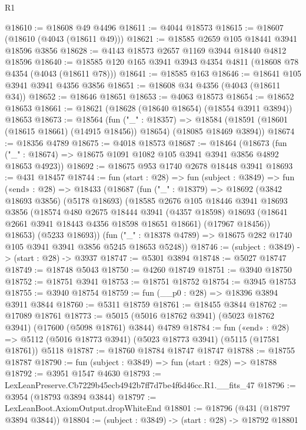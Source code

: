 \begin{lexlean}{R1}
\begin{coremodule}
@18610 := @18608 @49 @4496
@18611 := @4044 @18573
@18615 := @18607 (@18610 (@4043 (@18611 @49)))
@18621 := @18585 @2659 @105 @18441 @3941 @18596 @3856
@18628 := @4143 @18573 @2657 @1169 @3944 @18440 @4812 @18596
@18640 := @18585 @120 @165 @3941 @3943 @4354 @4811 (@18608 @78 @4354 (@4043 (@18611 @78)))
@18641 := @18585 @163
@18646 := @18641 @105 @3941 @3941 @4356 @3856
@18651 := @18608 @34 @4356 (@4043 (@18611 @34))
@18652 := @18646 @18651
@18653 := @4063 @18573
@18654 := @18652 @18653
@18661 := @18621 (@18628 (@18640 @18654) (@18554 @3911 @3894)) @18653
@18673 := @18564
    (fun ("_" : @18357) =>
    @18584 (@18591 (@18601 (@18615 @18661) (@14915 @18456)) @18654) (@18085 @18469 @3894))
@18674 := @18356 @4789
@18675 := @4018 @18573
@18687 := @18464
    (@18673 (fun ("_" : @18674) => @18675 @1091 @1082 @105 @3941 @3941 @3856 @4892 @18653 @4923))
@18692 := @18675 @953 @1740 @2678 @18448 @3941
@18693 := @431 @18457
@18744 := fun (start : @28) =>
  fun (subject : @3849) =>
  fun («end» : @28) =>
  @18433
    (@18687
      (fun ("_" : @18379) =>
      @18692
        (@3842 @18693 @3856)
        (@5178 @18693)
        (@18585
          @2676
          @105
          @18446
          @3941
          @18693
          @3856
          (@18574
            @480
            @2675
            @18444
            @3941
            (@4357 @18598)
            @18693
            (@18641 @2661 @3941 @18443 @4356 @18598 @18651 @18661)
            (@17967 @18456))
          @18653)
        (@5233 @18693))
      (fun ("_" : @18378 @4789) => @18675 @282 @1740 @105 @3941 @3941 @3856 @5245 @18653 @5248))
@18746 := (subject : @3849) -> (start : @28) -> @3937
@18747 := @5301 @3894
@18748 := @5027 @18747
@18749 := @18748 @5043
@18750 := @4260 @18749
@18751 := @3940 @18750
@18752 := @18751 @3941
@18753 := @18751 @18752
@18754 := @3945 @18753
@18755 := @3940 @18754
@18759 := fun (__p0 : @28) => @18396 @3894 @3911 @3844
@18760 := @5311 @18759
@18761 := @18455 @3844
@18762 := @17089 @18761
@18773 := @5015 (@5016 @18762 @3941) (@5023 @18762 @3941) (@17600 (@5098 @18761) @3844) @4789
@18784 := fun («end» : @28) =>
  @5112 (@5016 @18773 @3941) (@5023 @18773 @3941) (@5115 (@17581 @18761)) @5118
@18787 := @18760 @18784 @18747 @18747
@18788 := @18755 @18787
@18790 := fun (subject : @3849) => fun (start : @28) => @18788
@18792 := @3951 @1547 @4630
@18793 := LexLeanPreserve.Cb7229b45ecb4942b7ff7d7be4f6d46cc.R1.__fits_47
@18796 := @3954 (@18793 @3894 @3844)
@18797 := LexLeanBoot.AxiomOutput.dropWhiteEnd
@18801 := @18796 (@431 (@18797 @3894 @3844))
@18804 := (subject : @3849) -> (start : @28) -> @18792 @18801

\end{coremodule}
\end{lexlean}
